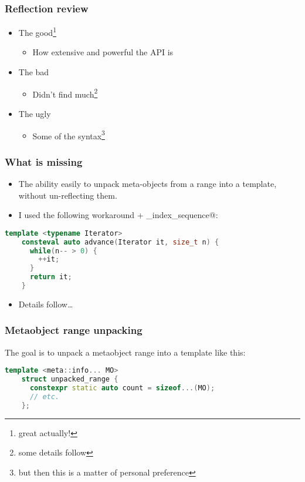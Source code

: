 \documentclass[compress,table,xcolor=table]{beamer}
\begin{document}
\begin{frame}
  \frametitle{Reflection review}
    \Huge
    \begin{itemize}
    \item{The good\footnote{great actually!}}
        \begin{itemize}
        \Large
        \item{How extensive and powerful the API is}
        \end{itemize}
    \item{The bad}
        \begin{itemize}
        \Large
        \item{Didn't find much\footnote{some details follow}}
        \end{itemize}
    \item{The ugly}
        \begin{itemize}
        \Large
        \item{Some of the syntax\footnote{but then this is a matter of personal preference}}
        \end{itemize}
    \end{itemize}
\end{frame}
\begin{frame}[fragile]
\frametitle{What is missing}
    \Large
    \begin{itemize}
    \item The ability easily to unpack meta-objects from a range into a template,
        without un-reflecting them.
    \item I used the following workaround + \verb@make_index_sequence@:
    \end{itemize}
    \begin{lstlisting}[language=c++]
    template <typename Iterator>
    consteval auto advance(Iterator it, size_t n) {
      while(n-- > 0) {
        ++it;
      }
      return it;
    }
    \end{lstlisting}
    \begin{itemize}
    \item Details follow\ldots
    \end{itemize}
\end{frame}
\begin{frame}[fragile]
\frametitle{Metaobject range unpacking}
  \Large
  The goal is to unpack a metaobject range into a template like this:
    \begin{lstlisting}[language=c++]
    template <meta::info... MO>
    struct unpacked_range {
      constexpr static auto count = sizeof...(MO);
      // etc.
    };
    \end{lstlisting}
\end{frame}
\end{document}
